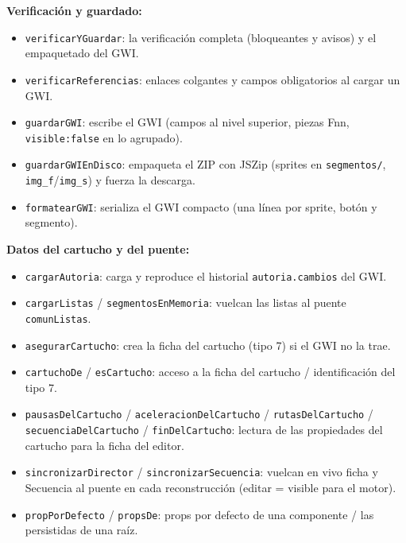 \documentclass[../main.tex]{subfiles}
\begin{document}
	\textbf{Verificación y guardado:}
	\begin{itemize}
		\item \texttt{verificarYGuardar}: la verificación completa
		(bloqueantes y avisos) y el empaquetado del GWI.
		\item \texttt{verificarReferencias}: enlaces colgantes y campos
		obligatorios al cargar un GWI.
		\item \texttt{guardarGWI}: escribe el GWI (campos al nivel
		superior, piezas Fnn, \texttt{visible:false} en lo agrupado).
		\item \texttt{guardarGWIEnDisco}: empaqueta el ZIP con JSZip
		(sprites en \texttt{segmentos/}, \texttt{img\_f}/\texttt{img\_s})
		y fuerza la descarga.
		\item \texttt{formatearGWI}: serializa el GWI compacto (una línea
		por sprite, botón y segmento).
	\end{itemize}
	
	\textbf{Datos del cartucho y del puente:}
	\begin{itemize}
		\item \texttt{cargarAutoria}: carga y reproduce el historial
		\texttt{autoria.cambios} del GWI.
		\item \texttt{cargarListas} / \texttt{segmentosEnMemoria}: vuelcan
		las listas al puente \texttt{comunListas}.
		\item \texttt{asegurarCartucho}: crea la ficha del cartucho (tipo 7)
		si el GWI no la trae.
		\item \texttt{cartuchoDe} / \texttt{esCartucho}: acceso a la ficha
		del cartucho / identificación del tipo 7.
		\item \texttt{pausasDelCartucho} / \texttt{aceleracionDelCartucho}
		/ \texttt{rutasDelCartucho} / \texttt{secuenciaDelCartucho} /
		\texttt{finDelCartucho}: lectura de las propiedades del cartucho
		para la ficha del editor.
		\item \texttt{sincronizarDirector} /
		\texttt{sincronizarSecuencia}: vuelcan en vivo ficha y Secuencia al
		puente en cada reconstrucción (editar = visible para el motor).
		\item \texttt{propPorDefecto} / \texttt{propsDe}: props por defecto
		de una componente / las persistidas de una raíz.
	\end{itemize}
	
\end{document}
